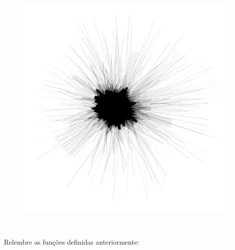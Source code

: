 \documentclass[11pt]{article}
\begin{document}
    \begin{figure}
    \centering
    \includegraphics[width = .65\textwidth]{output_89_0.png}
    \end{figure}
    { \hspace*{\fill} \\}
    
    Relembre as funções definidas anteriormente:
\end{document}
